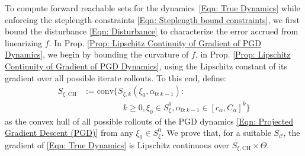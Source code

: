 \documentclass[letterpaper, 10 pt, conference]{ieeeconf}
\newcommand{\?}{\stackrel{?}{=}}
\newcommand{\paramSet}{\Theta}
\newcommand{\var}{\xi}
\newcommand{\ratePGD}{\alpha}
\newcommand{\ratePGDMin}{c_\ratePGD}
\newcommand{\ratePGDMax}{C_\ratePGD}
\newcommand{\dynamicsPGD}{f_{\text{PGD}}}
\newcommand{\constraintSet}{{S_{\mathcal{C}}}}
\newcommand{\dynamicsFullState}{f}
\newcommand{\varInitialSet}{S_\var^0}
\newcommand{\varForwardReachableSet}[1]{S_{\var, {#1}}}
\newcommand{\varConvexHull}{S_{\var, \text{CH}}}
\newcommand{\conv}{\text{conv}}
\newcommand{\frank}[1]{{\textcolor[rgb]{0,0,1}{\textsf{[Frank: {#1}]}}}}
\newcommand{\antoine}[1]{{\textcolor[rgb]{1,0,0}{\textsf{[Antoine: {#1}]}}}}
\begin{document}




To compute forward reachable sets for the dynamics~\eqref{Eqn: True Dynamics} while enforcing the steplength constraints \eqref{Eqn: Steplength bound constraints}, we first bound the disturbance \eqref{Eqn: Disturbance} to characterize the error accrued from linearizing $\dynamicsFullState$. 
In Prop. \ref{Prop: Lipschitz Continuity of Gradient of PGD Dynamics},
we
begin by bounding the curvature of $\dynamicsFullState$, 
in Prop. \ref{Prop: Lipschitz Continuity of Gradient of PGD Dynamics}, 
using the Lipschitz constant of its gradient over all possible iterate rollouts.
To this end, define:
{
\setlength{\abovedisplayskip}{3.5pt}
\setlength{\belowdisplayskip}{3.5pt}
\begin{align} \label{Eqn: Convex Hull of all Trajectories}
    \varConvexHull &:= \conv\big\{ \varForwardReachableSet{k}(\var_0, \ratePGD_{0:k-1}): \\ \nonumber
    &\hspace{2cm} k \geq 0, \var_0 \in \varInitialSet, \ratePGD_{0:k-1} \in [\ratePGDMin, \ratePGDMax]^k \big\}
\end{align}
}
\hspace{-1.7mm}as the convex hull of all possible rollouts of the PGD dynamics \eqref{Eqn: Projected Gradient Descent (PGD)} from any $\var_0 \in \varInitialSet$.
We prove that, for a suitable $\constraintSet$, the gradient of \eqref{Eqn: True Dynamics} is Lipschitz continuous over $\varConvexHull \times \paramSet$.
\end{document}
